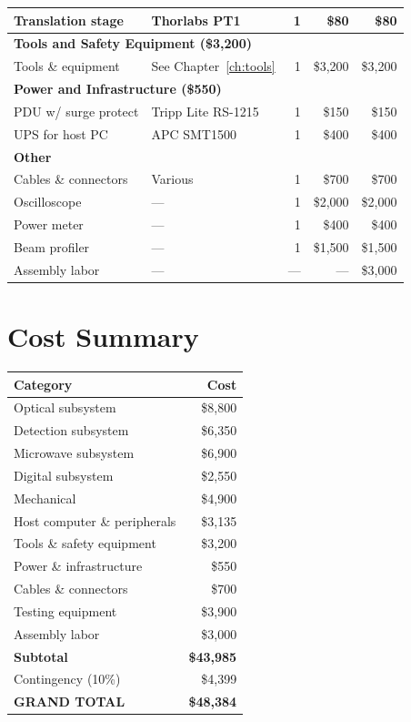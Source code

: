 \documentclass[11pt,a4paper,openany]{book}
\begin{document}
\begin{longtable}{p{4.2cm}lrrr}
Translation stage & Thorlabs PT1 & 1 & \$80 & \$80 \\
\midrule
\multicolumn{5}{l}{\textbf{Tools and Safety Equipment (\$3,200)}} \\
\midrule
Tools \& equipment & See Chapter~\ref{ch:tools} & 1 & \$3,200 & \$3,200 \\
\midrule
\multicolumn{5}{l}{\textbf{Power and Infrastructure (\$550)}} \\
\midrule
PDU w/ surge protect & Tripp Lite RS-1215 & 1 & \$150 & \$150 \\
UPS for host PC & APC SMT1500 & 1 & \$400 & \$400 \\
\midrule
\multicolumn{5}{l}{\textbf{Other}} \\
\midrule
Cables \& connectors & Various & 1 & \$700 & \$700 \\
Oscilloscope & --- & 1 & \$2,000 & \$2,000 \\
Power meter & --- & 1 & \$400 & \$400 \\
Beam profiler & --- & 1 & \$1,500 & \$1,500 \\
Assembly labor & --- & --- & --- & \$3,000 \\
\end{longtable}

\section{Cost Summary}


\begin{center}
\begin{tabular}{lr}
\toprule
\textbf{Category} & \textbf{Cost} \\
\midrule
Optical subsystem & \$8,800 \\
Detection subsystem & \$6,350 \\
Microwave subsystem & \$6,900 \\
Digital subsystem & \$2,550 \\
Mechanical & \$4,900 \\
Host computer \& peripherals & \$3,135 \\
Tools \& safety equipment & \$3,200 \\
Power \& infrastructure & \$550 \\
Cables \& connectors & \$700 \\
Testing equipment & \$3,900 \\
Assembly labor & \$3,000 \\
\midrule
\textbf{Subtotal} & \textbf{\$43,985} \\
Contingency (10\%) & \$4,399 \\
\midrule
\textbf{GRAND TOTAL} & \textbf{\$48,384} \\
\bottomrule
\end{tabular}
\end{center}
\end{document}
